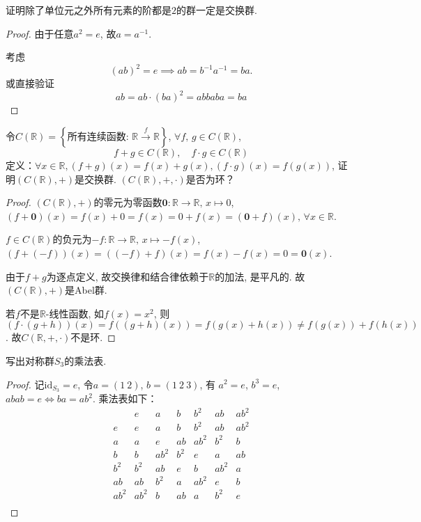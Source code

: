 \begin{problem}
    证明除了单位元之外所有元素的阶都是$2$的群一定是交换群.
\end{problem}

\begin{proof}
    由于任意$a^2 = e$, 故$a = a^{-1}$.

    考虑
\[
    (ab)^2 = e \implies ab = b^{-1}a^{-1} = ba.
\]
    或直接验证
\[
    ab = ab \cdot (ba)^2 = abbaba = ba
\]
\end{proof}

\begin{problem}
    令$C(\mathbb{R} ) = \left\{\text{所有连续函数: } \mathbb{R} \overset{f}\to \mathbb{R} \right\}$,
$\forall f ,\, g \in C(\mathbb{R})$,
\[
    f + g \in C(\mathbb{R}),\quad f \cdot g \in C(\mathbb{R})
\]
定义：$\forall x \in \mathbb{R}, (f + g)(x) = f(x) + g(x), (f \cdot g)(x) = f(g(x))$,
证明$(C(\mathbb{R}), +)$是交换群. $(C(\mathbb{R}), +, \cdot)$是否为环？
\end{problem}

\begin{proof}
    $(C(\mathbb{R}), +)$的零元为零函数$\mathbf{0}: \mathbb{R} \to \mathbb{R},\, x \mapsto 0$,
$(f + \mathbf{0})(x) = f(x) + 0 = f(x) = 0 + f(x) = (\mathbf{0} + f)(x),\, \forall x \in \mathbb{R}$.

    $f \in C(\mathbb{R})$的负元为$-f: \mathbb{R} \to \mathbb{R},\, x \mapsto -f(x)$,
$(f + (-f))(x) = ((-f) + f)(x) = f(x) - f(x) = 0 = \mathbf{0}(x)$.

    由于$f + g$为逐点定义, 故交换律和结合律依赖于$\mathbb{R}$的加法, 是平凡的.
故$(C(\mathbb{R}), +)$是Abel群.

    若$f$不是$\mathbb{R}$-线性函数, 如$f(x) = x^2$, 则$(f \cdot (g + h))(x) = f((g + h)(x)) = f(g(x) + h(x)) \neq f(g(x)) + f(h(x))$.
故$C(\mathbb{R}, +, \cdot)$不是环.
\end{proof}

\begin{problem}\label{ex:1.3.5}
    写出对称群$S_3$的乘法表.
\end{problem}

\begin{proof}
    记$\mathrm{id}_{S_3} = e$, 令$a = (1\:2)$, $b = (1\:2\:3)$, 有
$a^2 = e$, $b^3 = e$, $abab = e \iff ba = ab^2$. 乘法表如下：
\[
\begin{array}{c|cccccc}
  & e   & a   & b   & b^2 & ab  & ab^2 \\
\hline
e  & e   & a   & b   & b^2 & ab  & ab^2 \\
a  & a   & e   & ab  & ab^2 & b^2 & b \\
b  & b   & ab^2 & b^2 & e   & a   & ab \\
b^2 & b^2 & ab  & e   & b   & ab^2 & a \\
ab & ab  & b^2 & a   & ab^2 & e   & b \\
ab^2 & ab^2 & b   & ab  & a   & b^2 & e \\
\end{array}
\]
\end{proof}

